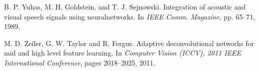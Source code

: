 \begin{thebibliography}{99}
{
  B. P. Yuhas, M. H. Goldstein, and T. J. Sejnowski. Integration of acoustic
  and visual speech signals using neuralnetworks. In \textit{IEEE Comm.
  Magazine}, pp. 65--71, 1989.

  M. D. Zeiler, G. W. Taylor and R. Fergus.
  Adaptive deconvolutional networks for mid and high level feature learning.
  In \textit{Computer Vision (ICCV), 2011 IEEE International Conference},
  pages 2018--2025, 2011.

}

\end{thebibliography}
